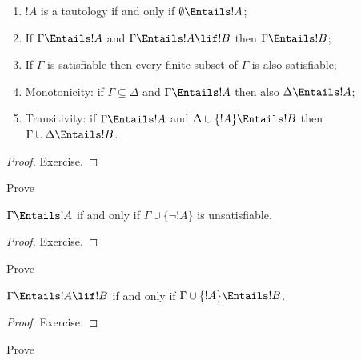 \begin{prop}
\begin{enumerate} 
\item $!A$ is a tautology if and only if
  $\emptyset \Entails !A$; 
\item If $\Gamma \Entails !A$ and $\Gamma \Entails !A \lif !B$ then
  $\Gamma \Entails !B$;
\item If $\Gamma$ is satisfiable then every finite subset of $\Gamma$
  is also satisfiable; 
\item {} Monotonicity: if $\Gamma \subseteq \Delta$
  and $\Gamma \Entails !A$ then also $\Delta \Entails !A$;
\item {} Transitivity: if $\Gamma \Entails !A$ and
  $\Delta \cup \{ !A\} \Entails !B$ then $\Gamma \cup \Delta \Entails
  !B$.
\end{enumerate}
\end{prop}

\begin{proof}
Exercise.
\end{proof}

\begin{prob}
Prove 
\end{prob}

\begin{prop}
  $\Gamma \Entails !A$ if and only if $\Gamma \cup \{\lnot !A\}$
  is unsatisfiable.
\end{prop}

\begin{proof}
Exercise.
\end{proof}

\begin{prob}
Prove 
\end{prob}

\begin{thm}
   $\Gamma \Entails !A \lif !B$ if and only
  if $\Gamma \cup \{!A\} \Entails !B$.
\end{thm}

\begin{proof}
Exercise.
\end{proof}

\begin{prob}
Prove 
\end{prob}



\OLEndChapterHook







